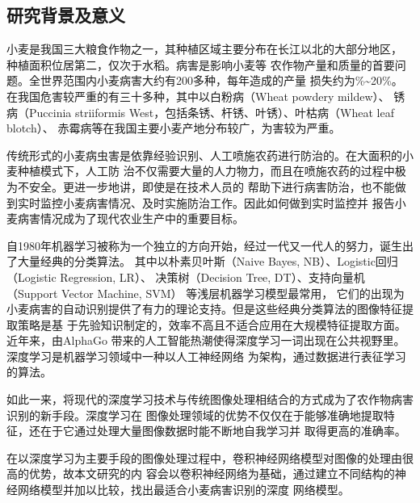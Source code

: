 
\subsection{\textbf{研究背景及意义}}
	小麦是我国三大粮食作物之一，\zs 其种植区域主要分布在长江以北\zs 的大部分地区，
	种植面积位居\zs 第二，仅次于水稻。病害是影响小麦\zs 等
	农作物产量和质量的\zs 首要问题。全世界范围内小麦病害大约有200多种，每年造成的产量
	损失约为\%\textasciitilde20\%。在我国危害较严重的有三十多种，其中以白粉病（Wheat powdery mildew）、
	锈病（Puccinia striiformis West，包括条锈、杆锈、叶锈）、叶枯病（Wheat leaf blotch）、
	赤霉病等在我国主要小麦产地分布较广，为害较为严重\cite{CGRIS}。

	传统形式的小麦病虫害是依靠经验识别、人工喷施农药进行防治的。在大面积的小麦种植模式下，人工防
	治不仅需要大量的人力物力，而且在喷施农药的过程中极为不安全。更进一步地讲，即使是在技术人员的
	帮助下进行病害防治，也不能做到实时监控小麦病害情况、及时实施防治工作。因此如何做到实时监控并
	报告小麦病害情况成为了现代农业生产中的重要目标。

	自1980年机器学习被称为一个独立的方向开始，经过一代又一代人的努力，诞生出了大量经典的分类算法。
	其中以朴素\zs 贝叶斯（Naive Bayes, NB）、Logistic\zs 回归（Logistic Regression, LR）、
	决策树\zs （Decision Tree, DT）、支持\zs 向量机（Support Vector Machine, SVM）
	\zs 等浅层机器学习模型最常用，
	它们的出现为小麦病害的自动识别提供了有力的理论支持。但是这些经典分类算法的图像特征提取策略是基
	于先验知识制定的，效率不高且不适合应用在大规模特征提取方面\cite{article1}。 近年来，由AlphaGo
	带来的人工智能热潮使得深度学习一词出现在公共视野里。 深度学习是机器学习领域中一种以人工神经网络
	为架构，通过数据进行表征学习的算法。

	如此一来，将现代的深度学习技术与传统图像处理相结合的方式成为了农作物病害识别的新手段。深度学习在
	图像处理领域的优势不仅仅在于能够准确地提取特征，还在于它通过处理大量图像数据时能不断地自我学习并
	取得更高的准确率。

	在以深度学习为主要手段的图像处理过程中，卷积神经网络模型对图像的处理由很高的优势，故本文研究的内
	容会以卷积神经网络为基础，通过建立不同结构的神经网络模型并加以比较，找出最适合小麦病害识别的深度
	网络模型。
